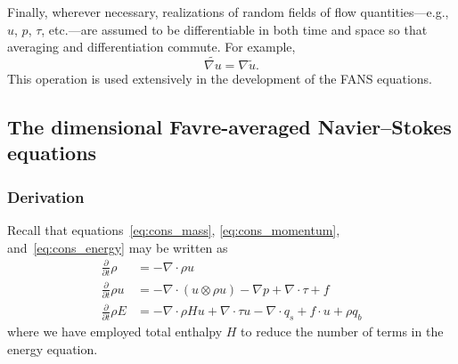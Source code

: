 \documentclass[letterpaper,11pt,nointlimits,reqno]{amsart}
\begin{document}
Finally, wherever necessary, realizations of random fields of flow
quantities---e.g., $u$, $p$, $\tau$, etc.---are assumed to be differentiable in
both time and space so that averaging and differentiation commute.  For
example,
%
\begin{equation*}
\widetilde{ \nabla{}u } = \nabla\tilde{u}.
\end{equation*}
%
This operation is used extensively in the development of the FANS equations.

\subsection{The dimensional Favre-averaged Navier--Stokes equations}

\subsubsection{Derivation}

Recall that equations~\eqref{eq:cons_mass}, \eqref{eq:cons_momentum},
and~\eqref{eq:cons_energy} may be written as
\begin{align}
    \frac{\partial}{\partial{}t}\rho
&=
  - \nabla\cdot\rho{}u
\\
    \frac{\partial{}}{\partial{}t}\rho{}u
&=
  - \nabla\cdot(u\otimes{}\rho{}u)
  - \nabla{}p + \nabla\cdot{}\tau + f
\\
    \frac{\partial}{\partial{}t} \rho{}E
&=
  - \nabla\cdot{}\rho{}Hu
  + \nabla\cdot{}\tau{}u
  - \nabla\cdot{}q_{s}
  + f\cdot{}u
  + \rho{}q_b
\end{align}
where we have employed total enthalpy $H$ to reduce the number of terms in the
energy equation.
\end{document}
